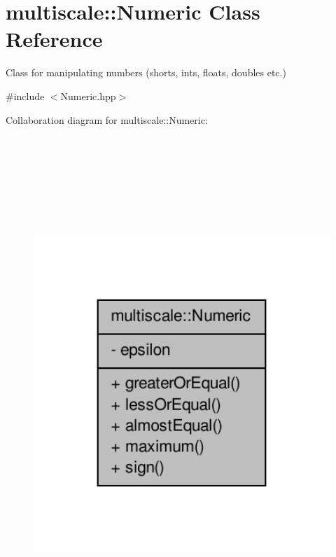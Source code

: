 \hypertarget{classmultiscale_1_1Numeric}{\section{multiscale\-:\-:Numeric Class Reference}
\label{classmultiscale_1_1Numeric}
}


Class for manipulating numbers (shorts, ints, floats, doubles etc.)  




{\ttfamily \#include $<$Numeric.\-hpp$>$}



Collaboration diagram for multiscale\-:\-:Numeric\-:\nopagebreak
\begin{figure}[H]
\begin{center}
\leavevmode
\includegraphics[height=550pt]{classmultiscale_1_1Numeric__coll__graph}
\end{center}
\end{figure}
